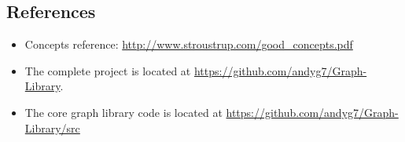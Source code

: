 \documentclass{article}
\begin{document}
\subsection{References}
\begin{itemize}
\item Concepts reference: \url{http://www.stroustrup.com/good_concepts.pdf}
\item The complete project is located at \url{https://github.com/andyg7/Graph-Library}.
\item The core graph library code is located at \url{https://github.com/andyg7/Graph-Library/src}
\end{itemize}
\end{document}
